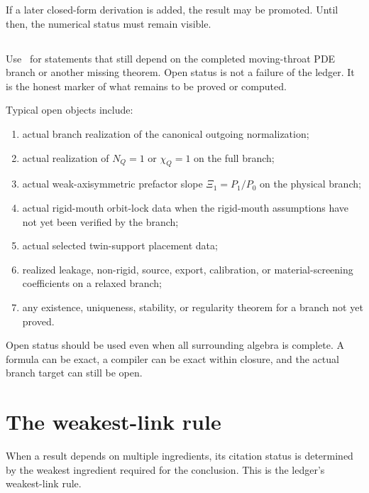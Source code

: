 If a later closed-form derivation is added, the result may be promoted.  Until then, the numerical status must remain visible.

\subsection{\StatusOpen}
\label{subsec:status-open}

Use \StatusOpen\ for statements that still depend on the completed moving-throat PDE branch or another missing theorem.  Open status is not a failure of the ledger.  It is the honest marker of what remains to be proved or computed.

Typical open objects include:
\begin{enumerate}[leftmargin=2.2em]
  \item actual branch realization of the canonical outgoing normalization;
  \item actual realization of \(N_Q=1\) or \(\chi_Q=1\) on the full branch;
  \item actual weak-axisymmetric prefactor slope \(\Xi_1=P_1/P_0\) on the physical branch;
  \item actual rigid-mouth orbit-lock data when the rigid-mouth assumptions have not yet been verified by the branch;
  \item actual selected twin-support placement data;
  \item realized leakage, non-rigid, source, export, calibration, or material-screening coefficients on a relaxed branch;
  \item any existence, uniqueness, stability, or regularity theorem for a branch not yet proved.
\end{enumerate}

Open status should be used even when all surrounding algebra is complete.  A formula can be exact, a compiler can be exact within closure, and the actual branch target can still be open.

\section{The weakest-link rule}
\label{sec:weakest-link-rule}

When a result depends on multiple ingredients, its citation status is determined by the weakest ingredient required for the conclusion.  This is the ledger's weakest-link rule.

